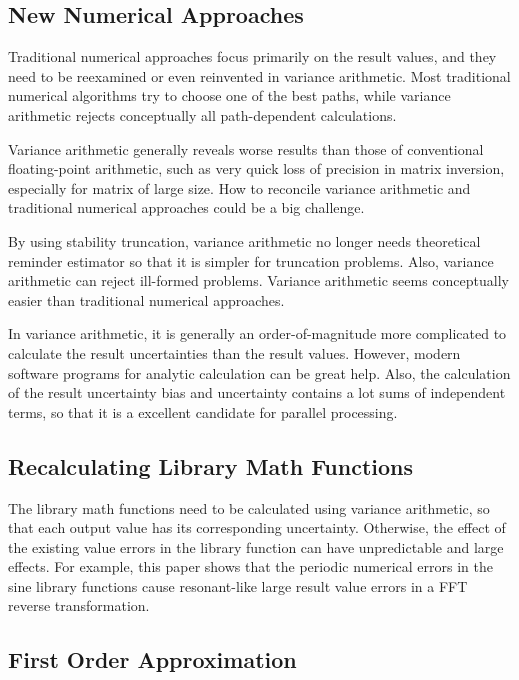 \documentclass[twoside]{article}
\numberwithin{equation}{section}
\begin{document}
\subsection{New Numerical Approaches}

Traditional numerical approaches focus primarily on the result values, and they need to be reexamined or even reinvented in variance arithmetic.
Most traditional numerical algorithms try to choose one of the best paths, while variance arithmetic rejects conceptually all path-dependent calculations.

Variance arithmetic generally reveals worse results than those of conventional floating-point arithmetic, such as very quick loss of precision in matrix inversion, especially for matrix of large size. 
How to reconcile variance arithmetic and traditional numerical approaches could be a big challenge.

By using stability truncation, variance arithmetic no longer needs theoretical reminder estimator so that it is simpler for truncation problems.
Also, variance arithmetic can reject ill-formed problems.
Variance arithmetic seems conceptually easier than traditional numerical approaches.

In variance arithmetic, it is generally an order-of-magnitude more complicated to calculate the result uncertainties than the result values.
However, modern software programs for analytic calculation can be great help.
Also, the calculation of the result uncertainty bias and uncertainty contains a lot sums of independent terms, so that it is a excellent candidate for parallel processing.


\subsection{Recalculating Library Math Functions}

The library math functions need to be calculated using variance arithmetic, so that each output value has its corresponding uncertainty.
Otherwise, the effect of the existing value errors in the library function can have unpredictable and large effects.
For example, this paper shows that the periodic numerical errors in the sine library functions cause resonant-like large result value errors in a FFT reverse transformation.


\subsection{First Order Approximation}
\end{document}
